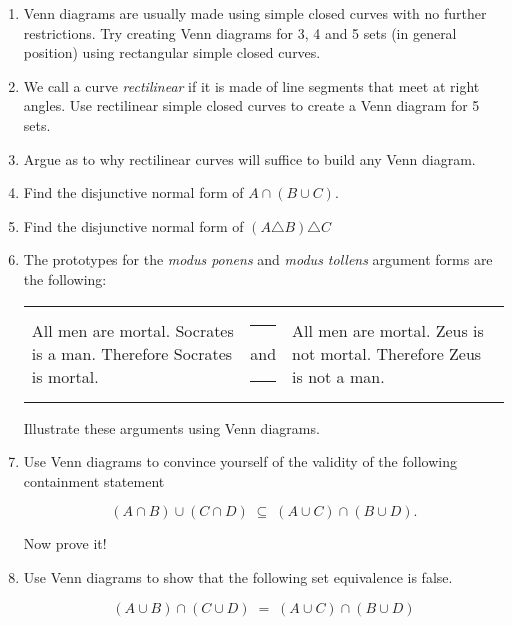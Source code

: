 \begin{enumerate}
\item  Venn diagrams are usually made using simple closed curves 
with no further restrictions.  Try creating Venn diagrams for 3, 4 and
5 sets (in general position) using rectangular simple closed curves.
\item  We call a curve \emph{rectilinear} if it is made
of line segments that meet at right angles.  Use rectilinear
simple closed curves to create a Venn diagram for 5 sets.
\item  Argue as to why rectilinear curves will suffice to build
any Venn diagram.
\item  Find the disjunctive normal form of $A \cap (B \cup C)$.
\item  Find the disjunctive normal form of $(A \triangle B) \triangle C$
\item The prototypes for the \emph{modus ponens} and \emph{modus tollens}
argument forms are the following:

\begin{tabular}{lcl}
\begin{minipage}{.3\textwidth}All men are mortal. \newline %
Socrates is a man. \newline
Therefore Socrates is mortal.\end{minipage} & \rule{16pt}{0pt} and \rule{16pt}{0pt} & %
 \begin{minipage}{.3\textwidth}All men are mortal. \newline %
Zeus is not mortal. \newline
Therefore Zeus is not a man.\end{minipage}
\end{tabular}

Illustrate these arguments using Venn diagrams.

\item Use Venn diagrams to convince yourself of the validity of
the following containment statement

\[ (A \cap B) \cup (C \cap D) \; \subseteq \; (A \cup C) \cap (B \cup D).\]

Now prove it!
 
\item Use Venn diagrams to show that the following set equivalence is false.

\[ (A \cup B) \cap (C \cup D) \; = \; (A \cup C) \cap (B \cup D) \]

\end{enumerate}




